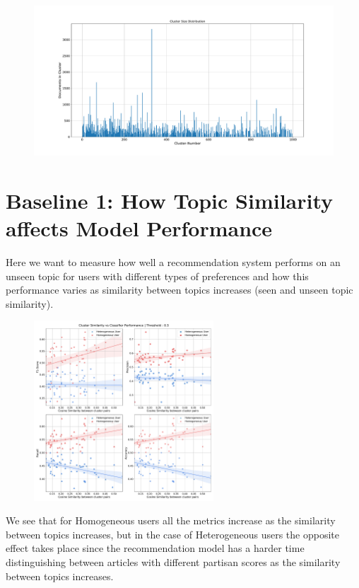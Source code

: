 \documentclass[a4paper,fontsize=9.0pt]{scrartcl}
\begin{document}
\begin{flushleft}
\begin{itemize}
\begin{itemize}
  \end{itemize}
\end{itemize}
\begin{figure}[H]
 \centering
 \includegraphics[width=1.0\textwidth]{Graphs/cluster_size_dist.pdf}
\end{figure}
\end{flushleft}


\newpage
\section{Baseline 1: How Topic Similarity affects Model Performance}
\begin{flushleft}
Here we want to measure how well a recommendation system performs on an unseen topic for users with different types of preferences and how this performance varies as similarity between topics increases (seen and unseen topic similarity).
\end{flushleft}
\vspace{-5ex}
\begin{figure}[H]
 \includegraphics[width=0.6\textwidth]{Graphs/cluster_sim_vs_model_perf_5.pdf}
\end{figure}
\begin{flushleft}
We see that for Homogeneous users all the metrics increase as the similarity between topics increases, but in the case of Heterogeneous users the opposite effect takes place since the recommendation model has a harder time distinguishing between articles with different partisan scores as the similarity between topics increases.
\end{flushleft}
\end{document}
